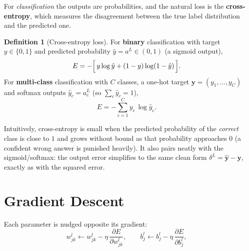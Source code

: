 \documentclass[11pt,a4paper]{report}
\theoremstyle{definition}
\newtheorem{definition}{Definition}[chapter]
\theoremstyle{remark}
\newcommand{\vy}{\mathbf{y}}
\newcommand{\pd}[2]{\frac{\partial #1}{\partial #2}}
\begin{document}
For \emph{classification} the outputs are probabilities, and the natural loss is
the \textbf{cross-entropy}, which measures the disagreement between the true
label distribution and the predicted one.

\begin{definition}[Cross-entropy loss]
For \textbf{binary} classification with target $y\in\{0,1\}$ and predicted
probability $\hat y=a^{L}\in(0,1)$ (a sigmoid output),
\begin{equation}
E=-\Bigl[\,y\log\hat y+(1-y)\log(1-\hat y)\,\Bigr].
\label{eq:bce}
\end{equation}
For \textbf{multi-class} classification with $C$ classes, a one-hot target
$\vy=(y_1,\dots,y_C)$ and softmax outputs $\hat y_c=a^{L}_{c}$
(so $\sum_c\hat y_c=1$),
\begin{equation}
E=-\sum_{c=1}^{C} y_c\,\log\hat y_c .
\label{eq:cce}
\end{equation}
\end{definition}

Intuitively, cross-entropy is small when the predicted probability of the
\emph{correct} class is close to $1$ and grows without bound as that probability
approaches $0$ (a confident wrong answer is punished heavily). It also pairs
neatly with the sigmoid/softmax: the output error simplifies to the same clean
form $\delta^{L}=\hat{\vy}-\vy$, exactly as with the squared error.

\section{Gradient Descent}
Each parameter is nudged opposite its gradient:
\begin{equation}
w^{l}_{jk}\leftarrow w^{l}_{jk}-\eta\,\pd{E}{w^{l}_{jk}},\qquad
b^{l}_{j}\leftarrow b^{l}_{j}-\eta\,\pd{E}{b^{l}_{j}},
\label{eq:gd}
\end{equation}
\end{document}
